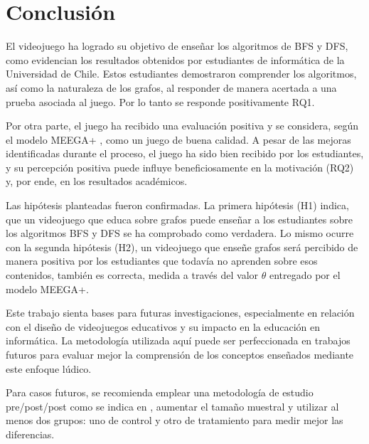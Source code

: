 \section{Conclusión}

El videojuego ha logrado su objetivo de enseñar los algoritmos de BFS y DFS, como evidencian los resultados obtenidos por estudiantes de informática de la Universidad de Chile. Estos estudiantes demostraron comprender los algoritmos, así como la naturaleza de los grafos, al responder de manera acertada a una prueba asociada al juego. Por lo tanto se responde positivamente RQ1.

Por otra parte, el juego ha recibido una evaluación positiva y se considera, según el modelo MEEGA+ \cite{meegaplus}, como un juego de buena calidad. A pesar de las mejoras identificadas durante el proceso, el juego ha sido bien recibido por los estudiantes, y su percepción positiva puede influye beneficiosamente en la motivación (RQ2) y, por ende, en los resultados académicos.

Las hipótesis planteadas fueron confirmadas. La primera hipótesis (H1) indica, que un videojuego que educa sobre grafos puede enseñar a los estudiantes sobre los algoritmos BFS y DFS se ha comprobado como verdadera. Lo mismo ocurre con la segunda hipótesis (H2), un videojuego que enseñe grafos será percibido de manera positiva por los estudiantes que todavía no aprenden sobre esos contenidos, también es correcta, medida a través del valor $\theta$ entregado por el modelo MEEGA+.

Este trabajo sienta bases para futuras investigaciones, especialmente en relación con el diseño de videojuegos educativos y su impacto en la educación en informática. La metodología utilizada aquí puede ser perfeccionada en trabajos futuros para evaluar mejor la comprensión de los conceptos enseñados mediante este enfoque lúdico.

Para casos futuros, se recomienda emplear una metodología de estudio pre/post/post como se indica en \cite{HowGamesComputingEducationEvaluated}, aumentar el tamaño muestral y utilizar al menos dos grupos: uno de control y otro de tratamiento para medir mejor las diferencias. 




